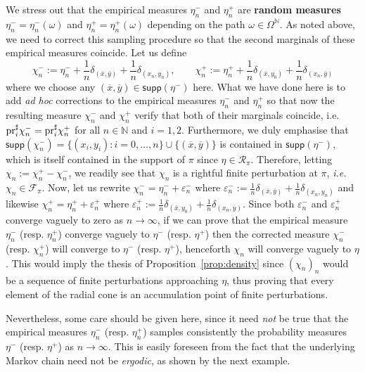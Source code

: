 \documentclass[leqno, 11pt, a4paper]{amsart}
\theoremstyle{definition}
\newcommand{\cR}{\mathcal{R}}
\newcommand{\N}{\mathbb{N}}
\newcommand{\cF}{\mathcal{F}}
\newcommand{\eps}{\varepsilon}
\newcommand{\supp}{\textsf{supp}}
\newcommand{\ox}{\overline{x}}
\newcommand{\oy}{\overline{y}}
\newcommand{\pr}{{\rm pr}}
\begin{document}
We stress out that the empirical measures $\eta^-_n$ and $\eta^+_n$ are \textbf{random measures} $\eta^-_n = \eta^-_n(\omega)$ and $\eta^+_n = \eta^+_n(\omega)$ depending on the path $\omega \in \Omega^\N$. As noted above, we need to correct this sampling procedure so that the second marginals of these empirical measures coincide. Let us define 
$$
\chi^-_n := \eta^-_n + \frac1n \delta_{(\ox, \oy)} + \frac1n \delta_{(x_{n}, y_n)}, \qquad \chi^+_n := \eta^+_n + \frac1n\delta_{(\ox, y_{0})} + \frac1n \delta_{(x_{n}, \oy)} 
$$
where we choose any $(\ox, \oy) \in \supp(\eta^-)$ here. What we have done here is to add \textit{ad hoc} corrections to the empirical measures $\eta^-_n$ and $\eta^+_n$ so that now the resulting measure $\chi_n^-$ and $\chi^+_n$ verify that both of their marginals coincide, i.e. $\pr_i^\sharp \chi^-_n = \pr_i^\sharp \chi^+_n$ for all $n \in \N$ and $i = 1, 2$. Furthermore, we duly emphasise that $\supp(\chi_n^-) = \{(x_i, y_i) : i = 0, \dots, n\} \cup \{(\ox, \oy)\}$ is contained in $\supp(\eta^-)$, which is itself contained in the support of $\pi$ since $\eta \in \cR_\pi$. Therefore, letting $\chi_n := \chi^+_n - \chi^-_n$, we readily see that $\chi_n$ is a rightful finite perturbation at $\pi$, \textit{i.e.} $\chi_n \in \cF_\pi$. Now, let us rewrite $\chi^-_n = \eta^-_n + \varepsilon^-_n$ where $\eps^-_n := \frac1n \delta_{(\ox, \oy)} + \frac1n \delta_{(x_{n}, y_{n})}$ and likewise $\chi^+_n = \eta^+_n + \eps^+_n$ where $\eps^+_n := \frac1n\delta_{(\ox, y_{0})} + \frac1n \delta_{(x_{n}, \oy)}$. Since both $\eps^-_n$ and $\eps^+_n$ converge vaguely to zero as $n \to \infty$, if we can prove that the empirical measure $\eta^-_n$ (resp. $\eta^+_n$) converge vaguely to $\eta^-$ (resp. $\eta^+$) then the corrected measure $\chi^-_n$ (resp. $\chi^+_n$) will converge to $\eta^-$ (resp. $\eta^+$), henceforth $\chi_n$ will converge vaguely to $\eta$. This would imply the thesis of Proposition~\ref{prop:density} since $(\chi_n)_n$ would be a sequence of finite perturbations approaching $\eta$, thus proving that every element of the radial cone is an accumulation point of finite perturbations.

Nevertheless, some care should be given here, since it need \textit{not} be true that the empirical measures $\eta^-_n$ (resp. $\eta^+_n$) samples consistently the probability measures $\eta^-$ (resp. $\eta^+$) as $n \to \infty$. This is easily foreseen from the fact that the underlying Markov chain need not be \textit{ergodic}, as shown by the next example.
\end{document}
